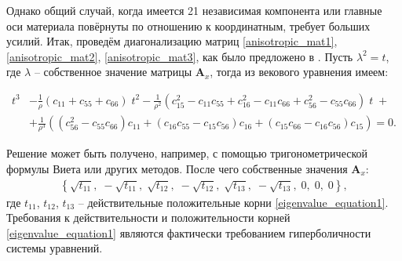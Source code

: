 Однако общий случай, когда имеется 21 независимая компонента или главные оси материала повёрнуты по отношению к координатным, требует больших усилий. Итак, проведём диагонализацию матриц \eqref{anisotropic_mat1}, \eqref{anisotropic_mat2}, \eqref{anisotropic_mat3}, как было предложено в \cite{favorskaya_anysotropy}.
Пусть  $\lambda^{2} = t$, где $\lambda$ -- собственное значение матрицы $\mathbf{A}_x$, тогда из векового уравнения имеем:
\begin{small}
\begin{align}	
	\label{eigenvalue_equation1}
	t^{3} &- \frac{1}{\rho}(c_{11} + c_{55} + c_{66})\;t^{2} - \frac{1}{\rho^{2}}(c_{15}^{2} - c_{11}c_{55} + c_{16}^{2} - c_{11}c_{66} + c_{56}^{2} - c_{55}c_{66})\;t\;+ \nonumber\\
	&+ \frac{1}{\rho^{3}}((c_{56}^{2} - c_{55}c_{66})c_{11} + (c_{16}c_{55} - c_{15}c_{56})c_{16} + (c_{15}c_{66} - c_{16}c_{56})c_{15}) = 0.
\end{align}
\end{small}
Решение может быть получено, например, с помощью тригонометрической формулы Виета или других методов. После чего собственные значения $\mathbf{A}_x$:
\begin{align}
	\left\{\sqrt{t_{11}},\;-\sqrt{t_{11}},\;\sqrt{t_{12}},\;-\sqrt{t_{12}},\;\sqrt{t_{13}},\;-\sqrt{t_{13}},\;0,\;0,\;0\right\},
\end{align}
где $t_{11}$, $t_{12}$, $t_{13}$ -- действительные положительные корни \eqref{eigenvalue_equation1}. Требования к действительности и положительности корней \eqref{eigenvalue_equation1} являются фактически требованием гиперболичности системы уравнений.
	
